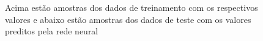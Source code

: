 \documentclass{article}
\begin{document}
\begin{figure}[!h]
\begin{minipage}[b]{0.4\textwidth}
                \caption{Acima estão amostras dos dados de treinamento com os
                respectivos valores e abaixo estão amostras dos dados de teste
                com os valores preditos pela rede neural}
            \end{minipage}
        \end{figure}
\end{document}
